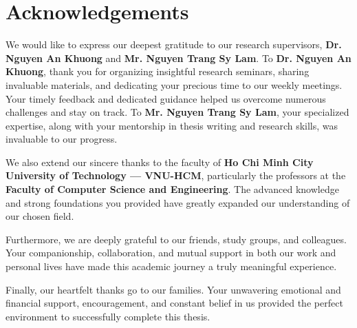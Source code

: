 \chapter*{Acknowledgements}

We would like to express our deepest gratitude to our research supervisors, \textbf{Dr. Nguyen An Khuong} and \textbf{Mr. Nguyen Trang Sy Lam}. To \textbf{Dr. Nguyen An Khuong}, thank you for organizing insightful research seminars, sharing invaluable materials, and dedicating your precious time to our weekly meetings. Your timely feedback and dedicated guidance helped us overcome numerous challenges and stay on track. To \textbf{Mr. Nguyen Trang Sy Lam}, your specialized expertise, along with your mentorship in thesis writing and research skills, was invaluable to our progress.

We also extend our sincere thanks to the faculty of \textbf{Ho Chi Minh City University of Technology — VNU-HCM}, particularly the professors at the \textbf{Faculty of Computer Science and Engineering}. The advanced knowledge and strong foundations you provided have greatly expanded our understanding of our chosen field.

Furthermore, we are deeply grateful to our friends, study groups, and colleagues. Your companionship, collaboration, and mutual support in both our work and personal lives have made this academic journey a truly meaningful experience.

Finally, our heartfelt thanks go to our families. Your unwavering emotional and financial support, encouragement, and constant belief in us provided the perfect environment to successfully complete this thesis.